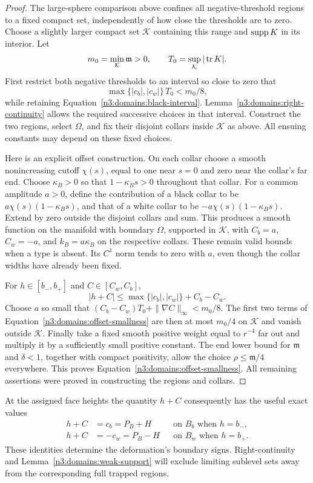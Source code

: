 \begin{proof}
The large-sphere comparison above confines all negative-threshold
regions to a fixed compact set, independently of how close the
thresholds are to zero.  Choose a slightly larger compact set
$\mathcal K$ containing this range and $\operatorname{supp} K$ in its interior.
Let
\[
 m_0=\min_{\mathcal K}\mathfrak m>0,
 \qquad T_0=\sup_{\mathcal K}|\operatorname{tr} K|.
\]
First restrict both negative thresholds to an interval so close to
zero that
\[
 \max\{|c_b|,|c_w|\}\,T_0<m_0/8,
\]
while retaining Equation~\eqref{n3:domains:black-interval}.  Lemma~\ref{n3:domains:right-continuity}
allows the required successive choices in that interval.  Construct
the two regions, select $\Omega$, and fix their disjoint collars
inside $\mathcal K$ as above.  All ensuing constants may depend on
these fixed choices.

Here is an explicit offset construction.  On each collar choose a
smooth nonincreasing cutoff $\chi(s)$, equal to one near $s=0$ and
zero near the collar's far end.  Choose $\kappa_B>0$ so that
$1-\kappa_Bs>0$ throughout that collar.  For a common amplitude
$a>0$, define the contribution of a black collar to be
$a\chi(s)(1-\kappa_Bs)$, and that of a white collar to be
$-a\chi(s)(1-\kappa_Bs)$.  Extend by zero outside the disjoint
collars and sum.  This produces a smooth function on the manifold
with boundary $\Omega$, supported in $\mathcal K$, with
$C_b=a$, $C_w=-a$, and $k_B=a\kappa_B$ on the respective collars.
These remain valid bounds when a type is absent.  Its $C^1$ norm
tends to zero with $a$, even though the collar widths have already
been fixed.

For $h\in[b_-,b_+]$ and $C\in[C_w,C_b]$,
\[
 |h+C|\leq\max\{|c_b|,|c_w|\}+C_b-C_w.
\]
Choose $a$ so small that
$(C_b-C_w)T_0+\|\nabla C\|_\infty<m_0/8$.
The first two terms of
Equation~\eqref{n3:domains:offset-smallness} are then at most
$m_0/4$ on $\mathcal K$ and vanish outside $\mathcal K$.
Finally take a fixed smooth positive weight equal to $r^{-4}$ far
out and multiply it by a sufficiently small positive constant.
The end lower bound for $\mathfrak m$ and $\delta<1$, together with
compact positivity, allow the choice $\rho\leq\mathfrak m/4$
everywhere.  This proves Equation~\eqref{n3:domains:offset-smallness}.
All remaining assertions were proved in constructing the regions
and collars.
\end{proof}

At the assigned face heights the quantity $h+C$ consequently has
the useful exact values
\begin{equation}\label{n3:domains:compatible-face-values}
 \begin{aligned}
  h+C&=c_b=P_B+H&&\text{on }B_b\text{ when }h=b_-,\\
  h+C&=-c_w=P_B-H&&\text{on }B_w\text{ when }h=b_+.
 \end{aligned}
\end{equation}
These identities determine the deformation's boundary signs.
Right-continuity and Lemma~\ref{n3:domains:weak-support} will exclude
limiting sublevel sets away from the corresponding full trapped regions.
